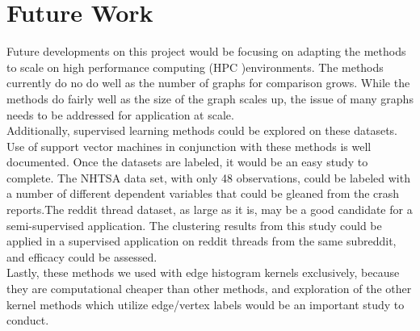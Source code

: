%
%
%

\chapter{Future Work}

Future developments on this project would be focusing on adapting the methods to scale on high performance computing (HPC )environments. The methods currently do no do well as the number of graphs for comparison grows. While the methods do fairly well as the size of the graph scales up, the issue of many graphs needs to be addressed for application at scale. \\
Additionally, supervised learning methods could be explored on these datasets. Use of support vector machines in conjunction with these methods is well documented. Once the datasets are labeled, it would be an easy study to complete. The NHTSA data set, with only 48 observations, could be labeled with a number of different dependent variables that could be gleaned from the crash reports.The reddit thread dataset, as large as it is, may be a good candidate for a semi-supervised application. The clustering results from this study could be applied in a supervised application on reddit threads from the same subreddit, and efficacy could be assessed. \\
Lastly, these methods we used with edge histogram kernels exclusively, because they are computational cheaper than other methods, and exploration of the other kernel methods which utilize edge/vertex labels would be an important study to conduct.
